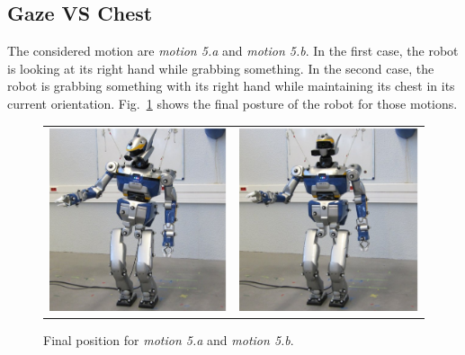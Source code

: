 \documentclass[journal]{IEEEtran}
\begin{document}
\subsection{Gaze VS Chest}
The considered motion are \emph{motion 5.a} and \emph{motion 5.b}.
In the first case, the robot is looking at its right hand while grabbing something.
In the second case, the robot is grabbing something with its right hand while
maintaining its chest in its current orientation. Fig.~\ref{fig:motion5}
shows the final posture of the robot for those motions.
\begin{figure}[t]
  \centering
  \begin{tabular}{cc}
    \includegraphics[width=0.45\linewidth]{img/realRobot/5a/5aFinal1.ps} &
    \includegraphics[width=0.45\linewidth]{img/realRobot/5b/5bFinal1.ps} \\
  \end{tabular}
  \caption{Final position for \emph{motion 5.a} and \emph{motion 5.b}.}
  \label{fig:motion5}
\end{figure}
\end{document}
